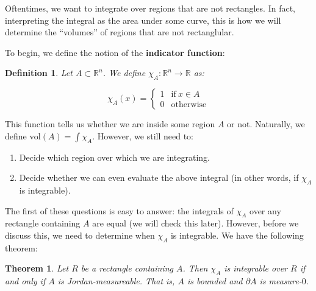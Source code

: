 \documentclass[10pt, oneside]{amsart}
\newtheorem{thm}{Theorem}
\newtheorem{defn}{Definition}
\begin{document}
    \hrulefill

    Oftentimes, we want to integrate over regions that are not rectangles. In fact, interpreting the integral as the area under some curve, this is how we will determine the ``volumes''
    of regions that are not rectanglular.
    \newline

    To begin, we define the notion of the \textbf{indicator function}:

    \begin{defn}
      Let $A \subset \mathbb{R}^{n}$. We define $\chi_A : \mathbb{R}^{n} \rightarrow \mathbb{R}$ as:

      $$\chi_A(x) = \begin{cases}
        1 & \text{if} \ x \in A \\
        0 & \text{otherwise}
      \end{cases}
      $$
      \end{defn}

      This function tells us whether we are inside some region $A$ or not. Naturally, we define $\text{vol}(A) = \int \chi_A$. However, we still need to:

      \begin{enumerate}
      \item Decide which region over which we are integrating.
      \item Decide whether we can even evaluate the above integral (in other words, if $\chi_A$ is integrable).
      \end{enumerate}

      The first of these questions is easy to answer: the integrals of $\chi_A$ over any rectangle containing $A$ are equal (we will check this later). However, before we discuss this, we
      need to determine when $\chi_A$ is integrable. We have the following theorem:

      \begin{thm}
        Let $R$ be a rectangle containing $A$. Then $\chi_A$ is integrable over $R$ if and only if $A$ is Jordan-measureable. That is, $A$ is bounded and $\partial A$ is
        measure-$0$.
      \end{thm}
\end{document}

